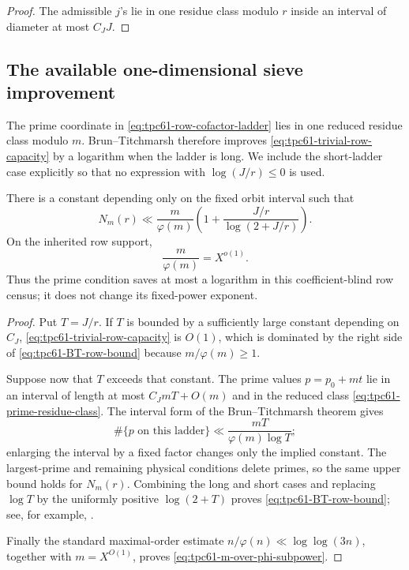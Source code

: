 \begin{proof}
The admissible \(j\)'s lie in one residue class modulo \(r\) inside an
interval of diameter at most \(C_JJ\).
\end{proof}

\subsection{The available one-dimensional sieve improvement}

The prime coordinate in \eqref{eq:tpc61-row-cofactor-ladder} lies in one
reduced residue class modulo \(m\).  Brun--Titchmarsh therefore improves
\eqref{eq:tpc61-trivial-row-capacity} by a logarithm when the ladder is
long.  We include the short-ladder case explicitly so that no expression
with \(\log(J/r)\le0\) is used.

\begin{proposition}
\label{prop:tpc61-brun-titchmarsh-row-bound}
There is a constant depending only on the fixed orbit interval such that
\begin{equation}
 \boxed{
 N_m(r)
 \ll
 \frac m{\varphi(m)}
 \left(
  1+\frac{J/r}{\log(2+J/r)}
 \right).}
 \label{eq:tpc61-BT-row-bound}
\end{equation}
On the inherited row support,
\begin{equation}
 \frac m{\varphi(m)}=X^{o(1)}.
 \label{eq:tpc61-m-over-phi-subpower}
\end{equation}
Thus the prime condition saves at most a logarithm in this
coefficient-blind row census; it does not change its fixed-power exponent.
\end{proposition}

\begin{proof}
Put \(T=J/r\).  If \(T\) is bounded by a sufficiently large constant
depending on \(C_J\), \eqref{eq:tpc61-trivial-row-capacity} is \(O(1)\),
which is dominated by the right side of \eqref{eq:tpc61-BT-row-bound}
because \(m/\varphi(m)\ge1\).

Suppose now that \(T\) exceeds that constant.  The prime values
\(p=p_0+mt\) lie in an interval of length at most \(C_JmT+O(m)\) and in
the reduced class \eqref{eq:tpc61-prime-residue-class}.  The interval form
of the Brun--Titchmarsh theorem gives
\begin{equation}
 \#\{p\text{ on this ladder}\}
 \ll
 \frac{mT}{\varphi(m)\log T};
 \label{eq:tpc61-BT-long-case}
\end{equation}
enlarging the interval by a fixed factor changes only the implied constant.
The largest-prime and remaining physical conditions delete primes, so the
same upper bound holds for \(N_m(r)\).  Combining the long and short cases
and replacing \(\log T\) by the uniformly positive
\(\log(2+T)\) proves \eqref{eq:tpc61-BT-row-bound}; see, for example,
\citet{MontgomeryVaughan2007}.

Finally the standard maximal-order estimate
\(n/\varphi(n)\ll\log\log(3n)\), together with
\(m=X^{O(1)}\), proves \eqref{eq:tpc61-m-over-phi-subpower}.
\end{proof}

